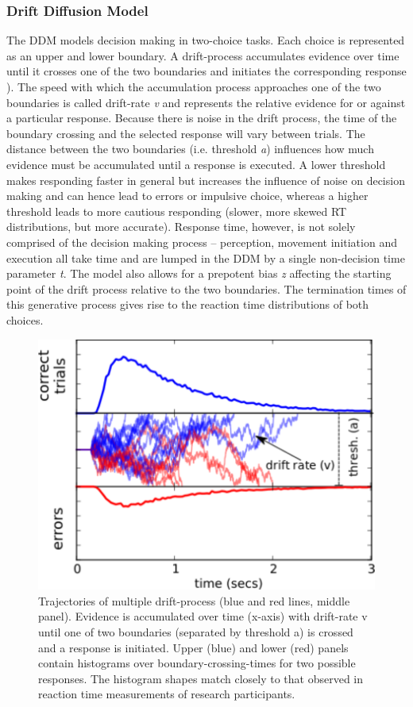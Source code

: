 \documentclass[letterpaper,10pt,english]{sphinxmanual}
\begin{document}
\subsubsection{Drift Diffusion Model}
\label{methods:drift-diffusion-model}
The DDM models decision making in two-choice tasks. Each choice is
represented as an upper and lower boundary. A drift-process
accumulates evidence over time until it crosses one of the two
boundaries and initiates the corresponding response
\citep{RatcliffRouder98,SmithRatcliff04}). The speed with
which the accumulation process approaches one of the two boundaries is
called drift-rate \emph{v} and represents the relative evidence for or
against a particular response. Because there is noise in the drift
process, the time of the boundary crossing and the selected response
will vary between trials. The distance between the two boundaries
(i.e. threshold \emph{a}) influences how much evidence must be accumulated
until a response is executed. A lower threshold makes responding
faster in general but increases the influence of noise on decision
making and can hence lead to errors or impulsive choice, whereas a
higher threshold leads to more cautious responding (slower, more
skewed RT distributions, but more accurate). Response time, however,
is not solely comprised of the decision making process -- perception,
movement initiation and execution all take time and are lumped in the
DDM by a single non-decision time parameter \emph{t}. The model also allows
for a prepotent bias \emph{z} affecting the starting point of the drift
process relative to the two boundaries. The termination times of this
generative process gives rise to the reaction time distributions of
both choices.
\begin{figure}[htbp]
\centering
\capstart

\includegraphics[scale=0.4]{DDM.pdf}
\caption{Trajectories of multiple drift-process (blue and red lines,
middle panel). Evidence is accumulated over time (x-axis) with
drift-rate v until one of two boundaries (separated by
threshold a) is crossed and a response is initiated. Upper (blue)
and lower (red) panels contain histograms over
boundary-crossing-times for two possible responses. The histogram
shapes match closely to that observed in reaction time
measurements of research participants.}\end{figure}
\end{document}
